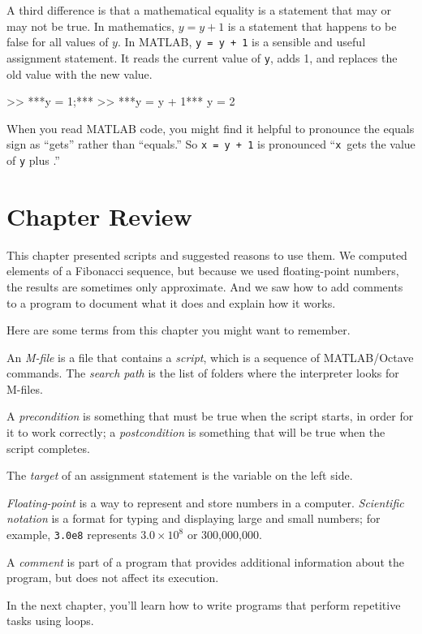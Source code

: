 A third difference is that a mathematical equality is a statement that
may or may not be true.  In mathematics, $y = y+1$ is a statement that
happens to be false for all values of $y$.  
In MATLAB, \lstinline{y = y + 1} is a sensible and useful assignment statement.
It reads the current value of \lstinline{y}, adds 1, and replaces the old value with the new value.

\begin{code}
>> ***y = 1;***
>> ***y = y + 1***
y = 2
\end{code}

When you read MATLAB code, you might find it helpful to pronounce
the equals sign as ``gets'' rather than ``equals.''  So \lstinline{x = y + 1}
is pronounced ``\lstinline{x}~gets the value of \lstinline{y} plus .''

\section{Chapter Review}

This chapter presented scripts and suggested reasons to use them.  We computed elements of a Fibonacci sequence, but because we used floating-point numbers, the results are sometimes only approximate.
And we saw how to add comments to a program to document what it does and explain how it works.

Here are some terms from this chapter you might want to remember.

An {\em M-file} is a file that contains a {\em script}, which is a sequence of MATLAB/Octave commands.
The {\em search path} is the list of folders where the interpreter looks for
M-files.

A {\em precondition} is something that must be true when the script
starts, in order for it to work correctly; a {\em postcondition} is something that will be true when the script completes.

The {\em target} of an assignment statement is the variable on the left side.

{\em Floating-point} is a way to represent and store numbers in a computer.
{\em Scientific notation} is a format for typing and displaying large
and small numbers; for example, \lstinline{3.0e8} represents $3.0 \times 10^8$
or 300,000,000.

A {\em comment} is part of a program that provides additional information
about the program, but does not affect its execution.

In the next chapter, you'll learn how to write programs that perform repetitive tasks using loops.


